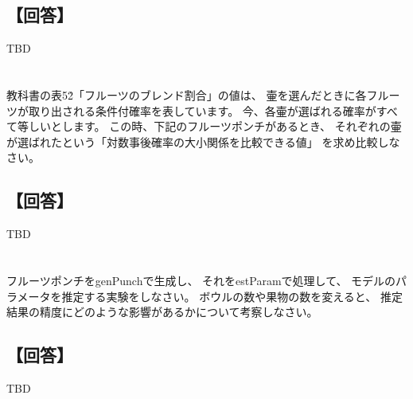 \documentclass[a4j]{jarticle}
\begin{document}
\subsection{【回答】}
TBD

\section{}
教科書の表5\.2「フルーツのブレンド割合」の値は、
壷を選んだときに各フルーツが取り出される条件付確率を表しています。
今、各壷が選ばれる確率がすべて等しいとします。
この時、下記のフルーツポンチがあるとき、
それぞれの壷が選ばれたという「対数事後確率の大小関係を比較できる値」
を求め比較しなさい。

\subsection{【回答】}
TBD

\section{}
フルーツポンチをgenPunchで生成し、
それをestParamで処理して、
モデルのパラメータを推定する実験をしなさい。
ボウルの数や果物の数を変えると、
推定結果の精度にどのような影響があるかについて考察しなさい。

\subsection{【回答】}
TBD
\end{document}
